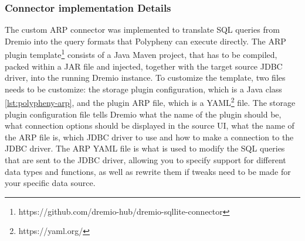\subsubsection{Connector implementation Details}
The custom ARP connector was implemented to translate SQL queries from Dremio into the query formats that Polypheny can execute directly.
The ARP plugin template\footnote{https://github.com/dremio-hub/dremio-sqllite-connector} consists of a Java Maven project, that has to be compiled, packed within a \ac{JAR} file and injected, together with the target source \ac{JDBC} driver, into the running Dremio instance.
To customize the template, two files needs to be customize: the storage plugin configuration, which is a Java class \ref{lst:polypheny-arp}, and the plugin ARP file, which is a YAML\footnote{https://yaml.org/} file.
The storage plugin configuration file tells Dremio what the name of the plugin should be, what connection options should be displayed in the source UI, what the name of the ARP file is, which JDBC driver to use and how to make a connection to the JDBC driver.
The ARP YAML file is what is used to modify the SQL queries that are sent to the JDBC driver, allowing you to specify support for different data types and functions, as well as rewrite them if tweaks need to be made for your specific data source. 


